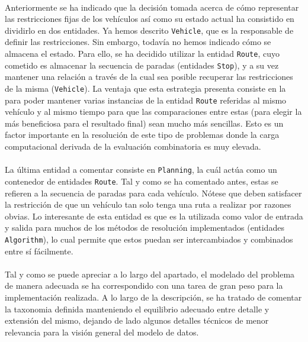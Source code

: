 \documentclass{subfiles}
\begin{document}
          \paragraph{}
          Anteriormente se ha indicado que la decisión tomada acerca de cómo representar las restricciones fijas de los vehículos así como su estado actual ha consistido en dividirlo en dos entidades. Ya hemos descrito \texttt{Vehicle}, que es la responsable de definir las restricciones. Sin embargo, todavía no hemos indicado cómo se almacena el estado. Para ello, se ha decidido utilizar la entidad \texttt{Route}, cuyo cometido es almacenar la secuencia de paradas (entidades \texttt{Stop}), y a su vez mantener una relación a través de la cual sea posible recuperar las restricciones de la misma (\texttt{Vehicle}). La ventaja que esta estrategia presenta consiste en la  para poder mantener varias instancias de la entidad \texttt{Route} referidas al mismo vehículo y al mismo tiempo para que las comparaciones entre estas (para elegir la más beneficiosa para el resultado final) sean mucho más sencillas. Esto es un factor importante en la resolución de este tipo de problemas donde la carga computacional derivada de la evaluación combinatoria es muy elevada.

          \paragraph{}
          La última entidad a comentar consiste en \texttt{Planning}, la cuál actúa como un contenedor de entidades \texttt{Route}. Tal y como se ha comentado antes, estas se refieren a la secuencia de paradas para cada vehículo. Nótese que deben satisfacer la restricción de que  un vehículo tan solo tenga una ruta a realizar por razones obvias. Lo interesante de esta entidad es que es la utilizada como valor de entrada y salida para muchos de los métodos de resolución implementados (entidades \texttt{Algorithm}), lo cual permite que estos puedan ser intercambiados y combinados entre sí fácilmente.

          \paragraph{}
          Tal y como se puede apreciar a lo largo del apartado, el modelado del problema de manera adecuada se ha correspondido con una tarea de gran peso para la implementación realizada. A lo largo de la descripción, se ha tratado de comentar la taxonomia definida manteniendo el equilibrio adecuado entre detalle y extensión del mismo, dejando de lado algunos detalles técnicos de menor relevancia para la visión general del modelo de datos.
\end{document}

